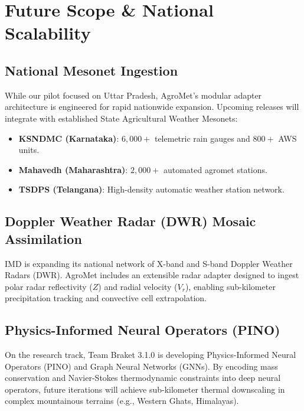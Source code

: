 \documentclass[11pt,a4paper,oneside]{report}
\begin{document}
\chapter{Future Scope \& National Scalability}

\section{National Mesonet Ingestion}
While our pilot focused on Uttar Pradesh, AgroMet's modular adapter architecture is engineered for rapid nationwide expansion. Upcoming releases will integrate with established State Agricultural Weather Mesonets:
\begin{itemize}[leftmargin=*]
    \item \textbf{KSNDMC (Karnataka)}: $6,000+$ telemetric rain gauges and $800+$ AWS units.
    \item \textbf{Mahavedh (Maharashtra)}: $2,000+$ automated agromet stations.
    \item \textbf{TSDPS (Telangana)}: High-density automatic weather station network.
\end{itemize}

\section{Doppler Weather Radar (DWR) Mosaic Assimilation}
IMD is expanding its national network of X-band and S-band Doppler Weather Radars (DWR). AgroMet includes an extensible radar adapter designed to ingest polar radar reflectivity ($Z$) and radial velocity ($V_r$), enabling sub-kilometer precipitation tracking and convective cell extrapolation.

\section{Physics-Informed Neural Operators (PINO)}
On the research track, Team Braket 3.1.0 is developing Physics-Informed Neural Operators (PINO) and Graph Neural Networks (GNNs). By encoding mass conservation and Navier-Stokes thermodynamic constraints into deep neural operators, future iterations will achieve sub-kilometer thermal downscaling in complex mountainous terrains (e.g., Western Ghats, Himalayas).

\end{document}
